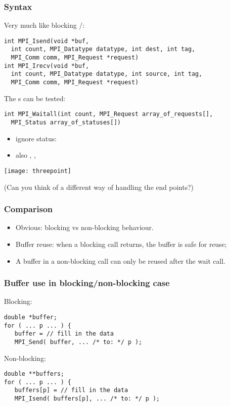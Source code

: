 \begin{frame}[containsverbatim]\frametitle{Syntax}
  \small
  Very much like blocking /:
\lstset{language=C}
\begin{lstlisting}
int MPI_Isend(void *buf,
  int count, MPI_Datatype datatype, int dest, int tag,
  MPI_Comm comm, MPI_Request *request)
int MPI_Irecv(void *buf,
  int count, MPI_Datatype datatype, int source, int tag,
  MPI_Comm comm, MPI_Request *request)  
\end{lstlisting}
The s can be tested:
\begin{lstlisting}
int MPI_Waitall(int count, MPI_Request array_of_requests[], 
  MPI_Status array_of_statuses[])
\end{lstlisting}
\begin{itemize}
\item ignore status: 
\item also , , 
\end{itemize}
\end{frame}

\begin{exerciseframe}[isendirecv]
  
  
  \texttt{[image: threepoint]}

  (Can you think of a different way of handling the end points?)
\end{exerciseframe}

\begin{frame}[containsverbatim]\frametitle{Comparison}
  \begin{itemize}
  \item Obvious: blocking vs non-blocking behaviour.
  \item Buffer reuse: when a blocking call returns, the buffer
    is safe for reuse;
  \item A buffer in a non-blocking call can only be reused
    after the wait call.
  \end{itemize}
\end{frame}

\begin{frame}[containsverbatim]\frametitle{Buffer use in blocking/non-blocking case}
Blocking:
\lstset{language=C}
\begin{lstlisting}
double *buffer;
for ( ... p ... ) {
   buffer = // fill in the data
   MPI_Send( buffer, ... /* to: */ p );
\end{lstlisting}
Non-blocking:
\begin{lstlisting}
double **buffers;
for ( ... p ... ) {
   buffers[p] = // fill in the data
   MPI_Isend( buffers[p], ... /* to: */ p );
\end{lstlisting}
\end{frame}

